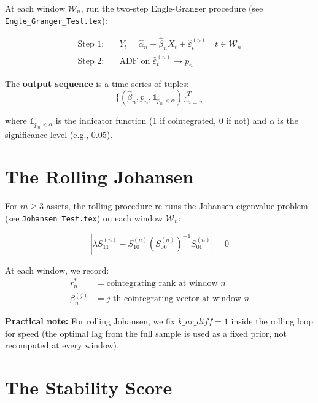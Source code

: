 \documentclass[12pt, a4paper]{article}
\begin{document}
At each window $\mathcal{W}_n$, run the two-step Engle-Granger procedure (see \texttt{Engle\_Granger\_Test.tex}):

\begin{align}
    \text{Step 1:}&\quad Y_t = \hat\alpha_n + \hat\beta_n X_t + \hat\varepsilon_t^{(n)} \quad t \in \mathcal{W}_n \label{eq:eg_step1}\\
    \text{Step 2:}&\quad \text{ADF on } \hat\varepsilon_t^{(n)} \rightarrow p_n \label{eq:eg_step2}
\end{align}

The \textbf{output sequence} is a time series of tuples:
\begin{equation}
    \{(\hat\beta_n, p_n, \mathbb{1}_{p_n < \alpha})\}_{n=w}^{T}
\end{equation}

where $\mathbb{1}_{p_n < \alpha}$ is the indicator function (1 if cointegrated, 0 if not) and 
$\alpha$ is the significance level (e.g., 0.05).

\section{The Rolling Johansen}

For $m \geq 3$ assets, the rolling procedure re-runs the Johansen eigenvalue problem 
(see \texttt{Johansen\_Test.tex}) on each window $\mathcal{W}_n$:

\begin{equation}
    \left| \lambda S_{11}^{(n)} - S_{10}^{(n)} (S_{00}^{(n)})^{-1} S_{01}^{(n)} \right| = 0
\end{equation}

At each window, we record:
\begin{align}
    r_n^* &= \text{cointegrating rank at window } n \\
    \beta_n^{(j)} &= j\text{-th cointegrating vector at window } n
\end{align}

\textbf{Practical note:} For rolling Johansen, we fix $k\_ar\_diff = 1$ inside the rolling 
loop for speed (the optimal lag from the full sample is used as a fixed prior, not recomputed 
at every window).

\section{The Stability Score}
\end{document}
